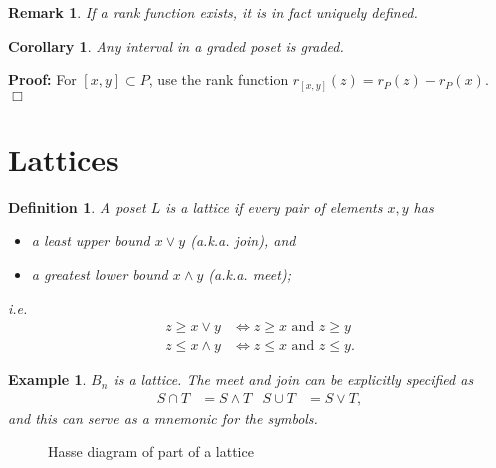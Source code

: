 \documentclass[11pt]{article}
\newtheorem{corollary}[theorem]{Corollary}
\newtheorem{definition}[theorem]{Definition}
\newtheorem{remark}[theorem]{Remark}
\newtheorem{example}[theorem]{Example}
\newenvironment{proof}{\noindent \textbf{Proof:}}{$\Box$}
\newcommand{\keyword}[1]{{\emph{#1}}}
\begin{document}
\begin{remark}
    If a rank function exists, it is in fact uniquely defined.
\end{remark}
\begin{corollary}
    Any interval in a graded poset is graded.
\end{corollary}
\begin{proof}
    For $[x,y] \subset P$, use the rank function $r_{[x,y]}(z) = r_P(z) - r_P(x)$.
\end{proof}

\section{Lattices}

\begin{definition}
    A poset $L$ is a \keyword{lattice} if every pair of elements $x,y$ has
    \begin{itemize}
        \item a \keyword{least upper bound} $x \vee y$ (a.k.a. \keyword{join}), and
        \item a \keyword{greatest lower bound} $x \wedge y$ (a.k.a. \keyword{meet});
    \end{itemize}
    i.e.
    \begin{align*}
        z \geq x \vee y &\iff z \geq x \text{ and } z \geq y \\
        z \leq x \wedge y &\iff z \leq x \text{ and } z \leq y .
    \end{align*}
\end{definition}
\begin{example}
    $B_n$ is a lattice. The meet and join can be explicitly specified as
    \begin{align*}
        S \cap T &= S \wedge T
        &
        S \cup T &= S \vee T ,
    \end{align*}
    and this can serve as a mnemonic for the symbols.
\end{example}

\begin{figure}[ht]
    \caption{Hasse diagram of part of a lattice}
    \begin{center}
    \end{center}
\end{figure}
\end{document}
